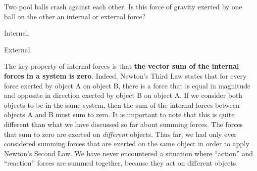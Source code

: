 \begin{checkpoint}
\begin{MCquestion}{Two pool balls crash against each other. Is this force of gravity exerted by one ball on the other an internal or external force?}
\item Internal. \correct
\item External.
\end{MCquestion}
\end{checkpoint}

The key property of internal forces is that \textbf{the vector sum of the internal forces in a system is zero}. Indeed, Newton's Third Law states that for every force exerted by object A on object B, there is a force that is equal in magnitude and opposite in direction exerted by object B on object A. If we consider both objects to be in the same system, then the sum of the internal forces between objects A and B must sum to zero. It is important to note that this is quite different than what we have discussed so far about summing forces. The forces that sum to zero are exerted on \textit{different} objects. Thus far, we had only ever considered summing forces that are exerted on the same object in order to apply Newton's Second Law. We have never encountered a situation where ``action'' and ``reaction'' forces are summed together, because they act on different objects.

